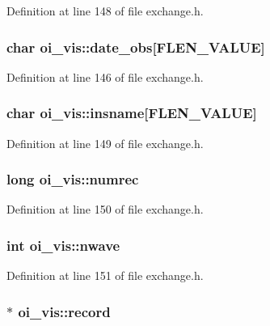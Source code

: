 Definition at line 148 of file exchange.h.

\hypertarget{structoi__vis_a8ba69c3cd63603e023569e6dc76421ba}{
\subsubsection[{date\_\-obs}]{\setlength{\rightskip}{0pt plus 5cm}char {\bf oi\_\-vis::date\_\-obs}\mbox{[}FLEN\_\-VALUE\mbox{]}}}
\label{structoi__vis_a8ba69c3cd63603e023569e6dc76421ba}


Definition at line 146 of file exchange.h.

\hypertarget{structoi__vis_a03ba94c11949483f9e7cbee002f3753f}{
\subsubsection[{insname}]{\setlength{\rightskip}{0pt plus 5cm}char {\bf oi\_\-vis::insname}\mbox{[}FLEN\_\-VALUE\mbox{]}}}
\label{structoi__vis_a03ba94c11949483f9e7cbee002f3753f}


Definition at line 149 of file exchange.h.

\hypertarget{structoi__vis_a9860977352b5c18a6feb1556c34b17fe}{
\subsubsection[{numrec}]{\setlength{\rightskip}{0pt plus 5cm}long {\bf oi\_\-vis::numrec}}}
\label{structoi__vis_a9860977352b5c18a6feb1556c34b17fe}


Definition at line 150 of file exchange.h.

\hypertarget{structoi__vis_a46c9e48253d148a7fcd0b00256058ca2}{
\subsubsection[{nwave}]{\setlength{\rightskip}{0pt plus 5cm}int {\bf oi\_\-vis::nwave}}}
\label{structoi__vis_a46c9e48253d148a7fcd0b00256058ca2}


Definition at line 151 of file exchange.h.

\hypertarget{structoi__vis_ae757f8004281973686de5e6eb28e7f56}{
\subsubsection[{record}]{$\ast$ {\bf oi\_\-vis::record}}}
\label{structoi__vis_ae757f8004281973686de5e6eb28e7f56}


